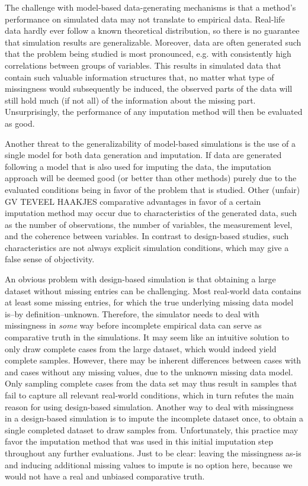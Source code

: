 \documentclass[bimj,fleqn]{w-art}
\begin{document}
The challenge with model-based data-generating mechanisms is that a method's performance on simulated data may not translate to empirical data. Real-life data hardly ever follow a known theoretical distribution, so there is no guarantee that simulation results are generalizable. Moreover, data are often generated such that the problem being studied is most pronounced, e.g. with consistently high correlations between groups of variables. This results in simulated data that contain such valuable information structures that, no matter what type of missingness would subsequently be induced, the observed parts of the data will still hold much (if not all) of the information about the missing part. Unsurprisingly, the performance of any imputation method will then be evaluated as good.

Another threat to the generalizability of model-based simulations is the use of a single model for both data generation and imputation. If data are generated following a model that is also used for imputing the data, the imputation approach will be deemed good (or better than other methods) purely due to the evaluated conditions being in favor of the problem that is studied. Other (unfair) GV TEVEEL HAAKJES comparative advantages in favor of a certain imputation method may occur due to characteristics of the generated data, such as the number of observations, the number of variables, the measurement level, and the coherence between variables. In contrast to design-based studies, such characteristics are not always explicit simulation conditions, which may give a false sense of objectivity.

An obvious problem with design-based simulation is that obtaining a large dataset without missing entries can be challenging. Most real-world data contains at least some missing entries, for which the true underlying missing data model is--by definition--unknown. Therefore, the simulator needs to deal with missingness in \textit{some} way before incomplete empirical data can serve as comparative truth in the simulations. It may seem like an intuitive solution to only draw complete cases from the large dataset, which would indeed yield complete samples. However, there may be inherent differences between cases with and cases without any missing values, due to the unknown missing data model. Only sampling complete cases from the data set may thus result in samples that fail to capture all relevant real-world conditions, which in turn refutes the main reason for using design-based simulation. Another way to deal with missingness in a design-based simulation is to impute the incomplete dataset once, to obtain a single completed dataset to draw samples from. Unfortunately, this practice may favor the imputation method that was used in this initial imputation step throughout any further evaluations. Just to be clear: leaving the missingness as-is and inducing additional missing values to impute is no option here, because we would not have a real and unbiased comparative truth.
\end{document}
